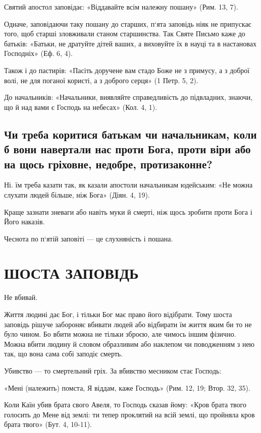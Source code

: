 \documentclass[main.tex]{subfiles}
\begin{document}
Святий апостол заповідає: «Віддавайте всім належну пошану» (Рим. 13, 7).

Одначе, заповідаючи таку пошану до старших, п`ята заповідь ніяк не припускає того, щоб старші зловживали станом старшинства. Так Святе Письмо каже до батьків: «Батьки, не дратуйте дітей ваших, а виховуйте їх в науці та в настановах Господніх» (Еф. 6, 4).

Також і до пастирів: «Пасіть доручене вам стадо Боже не з примусу, а з доброї волі, не для поганої користі, а з доброго серця» (1 Петр. 5, 2).

До начальників: «Начальники, виявляйте справедливість до підвладних, знаючи, що й над вами є Господь на небесах» (Кол. 4, 1).

\subsection{Чи треба коритися батькам чи начальникам, коли б вони навертали нас проти Бога, проти віри або на щось гріховне, недобре, протизаконне?}

Ні. їм треба казати так, як казали апостоли начальникам юдейським: «Не можна слухати людей більше, ніж Бога» (Діян. 4, 19).

Краще зазнати зневаги або навіть муки й смерті, ніж щось зробити проти Бога і Його наказів.

Чеснота по п`ятій заповіті — це слухняність і пошана.

\section{ШОСТА ЗАПОВІДЬ}

Не вбивай.

Життя людині дає Бог, і тільки Бог має право його відібрати. Тому шоста заповідь рішуче забороняє вбивати людей або відбирати їм життя яким би то не було чином. Бо вбити можна не тільки зброєю, але чимось іншим фізично. Можна вбити людину й словом образливим або наклепом чи поводженням з нею так, що вона сама собі заподіє смерть.

Убивство — то смертельний гріх. За вбивство месником стає Господь:

«Мені (належить) помста, Я віддам, каже Господь» (Рим. 12, 19; Втор. 32, 35).

Коли Каїн убив брата свого Авеля, то Господь сказав йому: «Кров брата твого голосить до Мене від землі: ти тепер проклятий на всій землі, що пройняла кров брата твого» (Бут. 4, 10-11).
 
\end{document}
